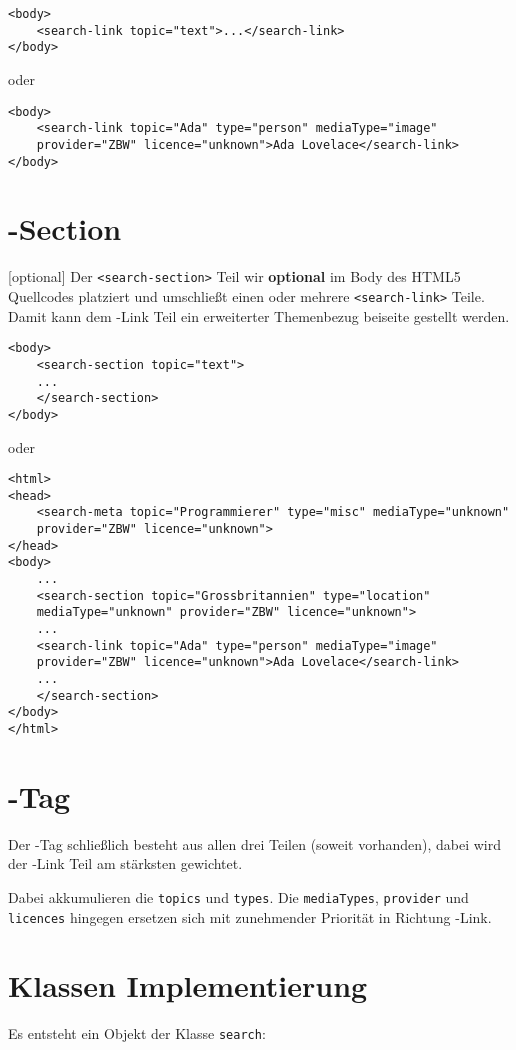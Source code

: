 \begin{lstlisting}
<body>
    <search-link topic="text">...</search-link>
</body>
\end{lstlisting}

oder

\begin{lstlisting}
<body>
    <search-link topic="Ada" type="person" mediaType="image"
    provider="ZBW" licence="unknown">Ada Lovelace</search-link>
</body>
\end{lstlisting}

\section{\SEARCH-Section}
[optional]
Der \Verb|<search-section>| Teil wir \textbf{optional} im Body des HTML5 Quellcodes platziert und umschließt einen oder mehrere \Verb|<search-link>| Teile. Damit kann dem \SEARCH-Link Teil ein erweiterter Themenbezug beiseite gestellt werden.

\begin{lstlisting}
<body>
    <search-section topic="text">
    ...
    </search-section>
</body>
\end{lstlisting}

oder

\begin{lstlisting}
<html>
<head>
    <search-meta topic="Programmierer" type="misc" mediaType="unknown"
    provider="ZBW" licence="unknown">
</head>
<body>
    ...
    <search-section topic="Grossbritannien" type="location"
    mediaType="unknown" provider="ZBW" licence="unknown">
    ...
    <search-link topic="Ada" type="person" mediaType="image"
    provider="ZBW" licence="unknown">Ada Lovelace</search-link>
    ...
    </search-section>
</body>
</html>
\end{lstlisting}

\section{\SEARCH-Tag}
Der \SEARCH-Tag schließlich besteht aus allen drei Teilen (soweit vorhanden), dabei wird der \SEARCH-Link Teil am stärksten gewichtet.

Dabei akkumulieren die \Verb|topics| und \Verb|types|.
Die \Verb|mediaTypes|, \Verb|provider| und \Verb|licences| hingegen ersetzen sich mit zunehmender Priorität in Richtung \SEARCH-Link.

\section{Klassen Implementierung}
Es entsteht ein Objekt der Klasse \Verb|search|:

